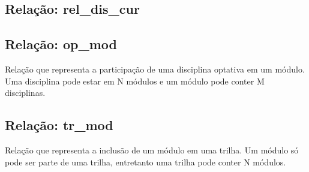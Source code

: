 \documentclass{article}
\begin{document}
  	\subsection{Relação: rel\_dis\_cur}
  	
  	\subsection{Relação: op\_mod}
  	    \quad Relação que representa a participação de uma disciplina optativa em um módulo. Uma disciplina pode estar em N módulos e um módulo pode conter M disciplinas.
  	
  	\subsection{Relação: tr\_mod}
  	    \quad Relação que representa a inclusão de um módulo em uma trilha. Um módulo só pode ser parte de uma trilha, entretanto uma trilha pode conter N módulos.
\end{document}
